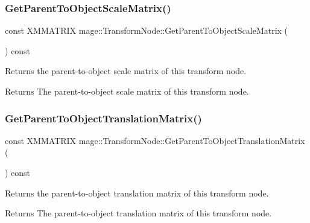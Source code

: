 \subsubsection{\texorpdfstring{Get\+Parent\+To\+Object\+Scale\+Matrix()}{GetParentToObjectScaleMatrix()}}
{\footnotesize\ttfamily const X\+M\+M\+A\+T\+R\+IX mage\+::\+Transform\+Node\+::\+Get\+Parent\+To\+Object\+Scale\+Matrix (\begin{DoxyParamCaption}{ }\end{DoxyParamCaption}) const}

Returns the parent-\/to-\/object scale matrix of this transform node.

\begin{DoxyReturn}{Returns}
The parent-\/to-\/object scale matrix of this transform node. 
\end{DoxyReturn}
\hypertarget{classmage_1_1_transform_node_ae2d0f336a5567a585c15895da26ce0c6}{}\label{classmage_1_1_transform_node_ae2d0f336a5567a585c15895da26ce0c6} 
\subsubsection{\texorpdfstring{Get\+Parent\+To\+Object\+Translation\+Matrix()}{GetParentToObjectTranslationMatrix()}}
{\footnotesize\ttfamily const X\+M\+M\+A\+T\+R\+IX mage\+::\+Transform\+Node\+::\+Get\+Parent\+To\+Object\+Translation\+Matrix (\begin{DoxyParamCaption}{ }\end{DoxyParamCaption}) const}

Returns the parent-\/to-\/object translation matrix of this transform node.

\begin{DoxyReturn}{Returns}
The parent-\/to-\/object translation matrix of this transform node. 
\end{DoxyReturn}
\hypertarget{classmage_1_1_transform_node_a7b5d7e5de537827bbb74c161f4fd7d20}{}\label{classmage_1_1_transform_node_a7b5d7e5de537827bbb74c161f4fd7d20} 
